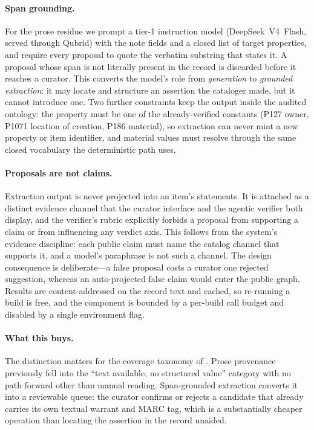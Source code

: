 \documentclass[Afour,sageh,times]{sagej}
\begin{document}
\paragraph{Span grounding.}
For the prose residue we prompt a tier-1 instruction model (DeepSeek~V4~Flash, served through Qubrid) with the note fields and a closed list of target properties, and require every proposal to quote the verbatim substring that states it. A proposal whose span is not literally present in the record is discarded before it reaches a curator. This converts the model's role from \emph{generation} to \emph{grounded extraction}: it may locate and structure an assertion the cataloger made, but it cannot introduce one. Two further constraints keep the output inside the audited ontology: the property must be one of the already-verified constants (P127 owner, P1071 location of creation, P186 material), so extraction can never mint a new property or item identifier, and material values must resolve through the same closed vocabulary the deterministic path uses.

\paragraph{Proposals are not claims.}
Extraction output is never projected into an item's statements. It is attached as a distinct evidence channel that the curator interface and the agentic verifier both display, and the verifier's rubric explicitly forbids a proposal from supporting a claim or from influencing any verdict axis. This follows from the system's evidence discipline: each public claim must name the catalog channel that supports it, and a model's paraphrase is not such a channel. The design consequence is deliberate---a false proposal costs a curator one rejected suggestion, whereas an auto-projected false claim would enter the public graph. Results are content-addressed on the record text and cached, so re-running a build is free, and the component is bounded by a per-build call budget and disabled by a single environment flag.

\paragraph{What this buys.}
The distinction matters for the coverage taxonomy of . Prose provenance previously fell into the ``text available, no structured value'' category with no path forward other than manual reading. Span-grounded extraction converts it into a reviewable queue: the curator confirms or rejects a candidate that already carries its own textual warrant and MARC tag, which is a substantially cheaper operation than locating the assertion in the record unaided.
\end{document}
